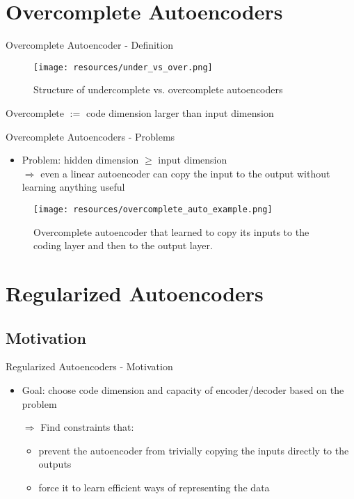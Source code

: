 \documentclass[handout]{beamer}
\begin{document}
\section{Overcomplete Autoencoders}
\begin{frame}[t]{Overcomplete Autoencoder - Definition}
        \begin{figure}[h]
            \centering
            \texttt{[image: resources/under\_vs\_over.png]}
            \caption{Structure of undercomplete vs. overcomplete autoencoders}
        \end{figure}
        \pause
        \begin{definition}
        Overcomplete $:=$ code dimension larger than input dimension
        \end{definition}
\end{frame}

\begin{frame}[t]{Overcomplete Autoencoders - Problems}
    \begin{itemize}
        \item Problem: hidden dimension $\geq$ input dimension \\ 
            \pause
            $\Rightarrow$ even a linear autoencoder can copy the input to the output without learning anything useful
    \end{itemize} 
\begin{figure}[h]
    \centering
    \texttt{[image: resources/overcomplete\_auto\_example.png]}
    \caption{Overcomplete autoencoder that learned to copy its inputs to the coding layer and then to the output layer.} \end{figure}
\end{frame}

\section{Regularized Autoencoders}
\subsection{Motivation}
\begin{frame}[t]{Regularized Autoencoders - Motivation}
   \begin{itemize}
       \item Goal: choose code dimension and capacity of encoder/decoder based on the problem 
           \pause

        $\Rightarrow$ Find constraints that: 
           \begin{itemize}
               \item prevent the autoencoder from trivially copying the inputs directly to the outputs
                   \pause
               \item force it to learn efficient ways of representing the data
           \end{itemize}
   \end{itemize} 
\end{frame}
\end{document}
